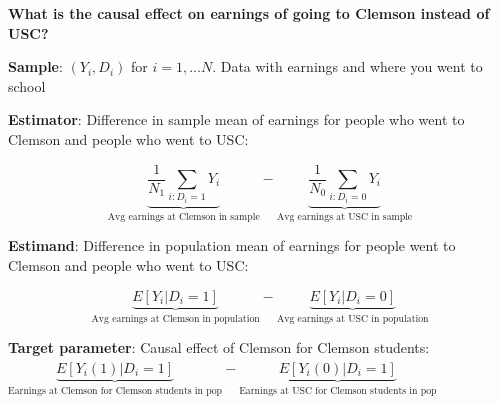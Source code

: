 \documentclass[11pt, aspectratio=169]{beamer}
\newenvironment{wideitemize}{\itemize\addtolength{\itemsep}{5pt}}{\enditemize}
\begin{document}
\begin{frame}{\bf \large What is the causal effect on earnings of going to Clemson instead of USC?}
\begin{wideitemize}
	\item
	\textbf{Sample}: $(Y_i,D_i)$ for $i=1,...N$. Data with earnings and where you went to school
	
	\pause 
	
	\item
	\textbf{Estimator}: Difference in sample mean of earnings for people who went to Clemson and people who went to USC: 
			
			$$ \underbrace{\frac{1}{N_1} \sum_{i:D_i=1} Y_i}_{\text{Avg earnings at Clemson in sample}} - \underbrace{\frac{1}{N_0} \sum_{i:D_i=0} Y_i}_{\text{Avg earnings at USC in sample}}$$		

	
	\pause
		\item
		\textbf{Estimand}: 
			Difference in population mean of earnings for people went to Clemson and people who went to USC: 
			
			$$\underbrace{ E[ Y_i | D_i = 1] }_{\text{Avg earnings at Clemson in population}} - \underbrace{E[Y_i | D_i = 0]}_{\text{Avg earnings at USC in population}}$$
		 
	\pause 
	
	\item \textbf{Target parameter}: Causal effect of Clemson for Clemson students:
			$\underbrace{E[Y_i(1) | D_i =1]}_{\text{Earnings at Clemson for Clemson students in pop}} - \underbrace{E[Y_i(0) | D_i = 1]}_{\text{Earnings at USC for Clemson students in pop}} $ 
		\end{wideitemize}
\end{frame}
\end{document}
